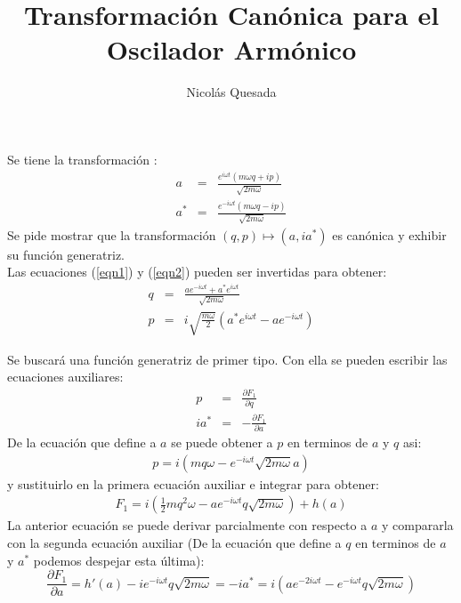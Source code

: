 \documentclass[spanish,12pt]{shreyasnotes}
\title{Transformaci\'on Can\'onica para el Oscilador Arm\'onico}
\author{Nicol\'as Quesada}
\date{}
\begin{document}
\maketitle

Se tiene la transformaci\'on :
\begin{eqnarray}
a&=&\frac{e^{i  \omega t} (m \omega q + i p )}{
   \sqrt{ 2 m \omega }} 
\label{eqn1}
\\
a^*&=&\frac{e^{-i  \omega t} (m \omega q - i p)}{
   \sqrt{ 2m \omega }} 
\label{eqn2}
\end{eqnarray}
Se pide mostrar que la transformaci\'on $(q,p)\longmapsto(a,ia^{*})$ es can\'onica y exhibir su funci\'on generatriz.\\

Las ecuaciones (\ref{eqn1}) y (\ref{eqn2}) pueden ser invertidas para obtener:
\begin{eqnarray}
q&=&\frac{ a e^{-i \omega t }+a^* e^{i \omega t}}{\sqrt{2 m \omega}}\\
p&=&i  \sqrt{\frac{m \omega}{2}} \left(a^* e^{i \omega t}-a e^{-i \omega t}\right)
\end{eqnarray}

Se buscar\'a una funci\'on generatriz de primer tipo. Con ella se pueden escribir las ecuaciones auxiliares:
\begin{eqnarray}
p&=&\frac{\partial F_1}{\partial q} \\
i a^*&=&-\frac{\partial F_1}{\partial a} 
\end{eqnarray}
De la ecuaci\'on que define a $a$ se puede obtener a $p$ en terminos de $a$ y $q$ asi:
\begin{eqnarray}
p=i \left(m q \omega - e^{-i \omega t} \sqrt{2 m \omega} a \right)
\end{eqnarray}
y sustituirlo en la primera ecuaci\'on auxiliar e integrar para obtener:
\begin{eqnarray}
F_1=i \left(\frac{1}{2} m q^2 \omega - a e^{-i 
   \omega t} q \sqrt{2 m \omega }\right)+h(a)
\end{eqnarray}
La anterior ecuaci\'on se puede derivar parcialmente con respecto a $a$ y compararla con la segunda ecuaci\'on auxiliar (De la ecuaci\'on que define a $q$ en terminos de $a$ y $a^*$ podemos despejar esta \'ultima):
\begin{equation}
\frac{\partial F_1}{\partial a}=h'(a)-i  e^{-i  \omega t} q \sqrt{2 m \omega }=-i a^*=i \left(a e^{-2 i  \omega t}- e^{-i  \omega t } q \sqrt{2 m \omega }\right)
\end{equation}
\end{document}
